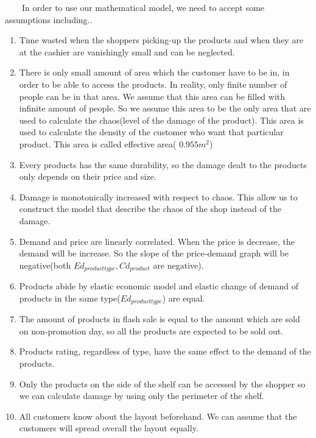 \ \ \ \ In order to use our mathematical model, we need to accept some assumptions including..
\begin{enumerate}
    \item Time wasted when the shoppers picking-up the products and when they are at the cashier are vanishingly small and can be neglected.
    \item There is only small amount of area which the customer have to be in, in order to be able to access the products. In reality, only finite number of people can be in that area. We assume that this area can be filled with infinite amount of people. So we assume this area to be the only area that are used to calculate the chaos(level of the damage of the product). This area is used to calculate the density of the customer who want that particular product. This area is called effective area( $0.955 m^2$)
    \item Every products has the same durability, so the damage dealt to the products only depends on their price and size.
    \item Damage is monotonically increased with respect to chaos. This allow us to construct the model that describe the chaos of the shop instead of the damage.
    \item Demand and price are linearly correlated. When the price is decrease, the demand will be increase. So the slope of the price-demand graph will be negative(both $Ed_{producttype},Cd_{product}$ are negative).
    \item Products abide by elastic economic model and elastic change of demand of products in the same type($Ed_{product type}$) are equal.
    \item The amount of products in flash sale is equal to the amount which are sold on non-promotion day, so all the products are expected to be sold out.
    \item Products rating, regardless of type, have the same effect to the demand of the products.
    \item Only the products on the side of the shelf can be accessed by the shopper so we can calculate damage by using only the perimeter of the shelf.
    \item All customers know about the layout beforehand. We can assume that the customers will spread overall the layout equally.
\end{enumerate}
 